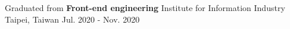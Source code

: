 \begin{cventries}
  \cventry
    {Graduated from \textbf{ Front-end engineering }} %
    {Institute for Information Industry
    } %
    {\color{gray}Taipei, Taiwan} %
    {Jul. 2020 - Nov. 2020} %
    {}
\end{cventries}
